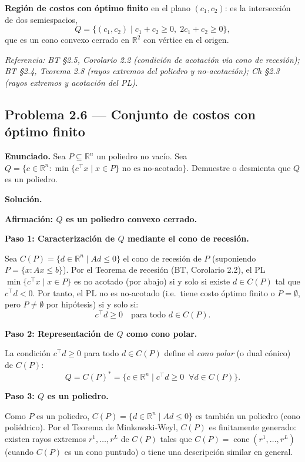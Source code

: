 \documentclass{article}
\begin{document}
\textbf{Región de costos con óptimo finito} en el plano $(c_1, c_2)$: es la intersección de dos semiespacios,
\[
Q = \{(c_1,c_2) \mid c_1 + c_2 \geq 0,\; 2c_1 + c_2 \geq 0\},
\]
que es un cono convexo cerrado en $\mathbb{R}^2$ con vértice en el origen.

\medskip\noindent\textit{Referencia: BT §2.5, Corolario 2.2 (condición de acotación via cono de recesión); BT §2.4, Teorema 2.8 (rayos extremos del poliedro y no-acotación); Ch §2.3 (rayos extremos y acotación del PL).}

\newpage
\subsection*{Problema 2.6 — Conjunto de costos con óptimo finito}

\textbf{Enunciado.} Sea $P \subseteq \mathbb{R}^n$ un poliedro no vacío. Sea $Q = \{c \in \mathbb{R}^n : \min\{c^\top x \mid x \in P\} \text{ no es no-acotado}\}$. Demuestre o desmienta que $Q$ es un poliedro.

\medskip
\noindent\textbf{Solución.}

\textbf{Afirmación: $Q$ es un poliedro convexo cerrado.}

\textbf{Paso 1: Caracterización de $Q$ mediante el cono de recesión.}

Sea $C(P) = \{d \in \mathbb{R}^n \mid Ad \leq 0\}$ el cono de recesión de $P$ (suponiendo $P = \{x : Ax \leq b\}$). Por el Teorema de recesión (BT, Corolario 2.2), el PL $\min\{c^\top x \mid x \in P\}$ es no acotado (por abajo) si y solo si existe $d \in C(P)$ tal que $c^\top d < 0$. Por tanto, el PL no es no-acotado (i.e.\ tiene costo óptimo finito o $P = \emptyset$, pero $P \neq \emptyset$ por hipótesis) si y solo si:
\[
c^\top d \geq 0 \quad \text{para todo } d \in C(P).
\]

\textbf{Paso 2: Representación de $Q$ como cono polar.}

La condición $c^\top d \geq 0$ para todo $d \in C(P)$ define el \emph{cono polar} (o dual cónico) de $C(P)$:
\[
Q = C(P)^* = \{c \in \mathbb{R}^n \mid c^\top d \geq 0 \;\;\forall d \in C(P)\}.
\]

\textbf{Paso 3: $Q$ es un poliedro.}

Como $P$ es un poliedro, $C(P) = \{d \in \mathbb{R}^n \mid Ad \leq 0\}$ es también un poliedro (cono poliédrico). Por el Teorema de Minkowski-Weyl, $C(P)$ es finitamente generado: existen rayos extremos $r^1, \ldots, r^L$ de $C(P)$ tales que $C(P) = \operatorname{cone}(r^1, \ldots, r^L)$ (cuando $C(P)$ es un cono puntudo) o tiene una descripción similar en general.
\end{document}
